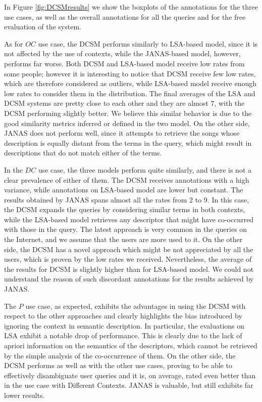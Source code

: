 In Figure \ref{fig:DCSMresults} we show the boxplots of the annotations for the three use cases, as well as the overall annotations for all the queries and for the free evaluation of the system.

As for $OC$ use case, the DCSM performs similarly to LSA-based model, since it is not affected by the use of contexts, while the JANAS-based model, however, performs far worse. Both DCSM and LSA-based model receive low rates from some people; however it is interesting to notice that DCSM receive few low rates, which are therefore considered as outliers, while LSA-based model receive enough low rates to consider them in the distribution. The final averages of the LSA and DCSM systems are pretty close to each other and they are almost $7$, with the DCSM performing slightly better. We believe this similar behavior is due to the good similarity metrics inferred or defined in the two model. On the other side, JANAS does not perform well, since it attempts to retrieve the songs whose description is equally distant from the terms in the query, which might result in descriptions that do not match either of the terms.

In the $DC$ use case, the three models perform quite similarly, and there is not a clear prevalence of either of them. The DCSM receives annotations with a high variance, while annotations on LSA-based model are lower but constant. The results obtained by JANAS spans almost all the rates from 2 to 9. In this case, the DCSM expands the queries by considering similar terms in both contexts, while the LSA-based model retrieves any descriptor that might have co-occurred with those in the query. The latest approach is very common in the queries on the Internet, and we assume that the users are more used to it. On the other side, the DCSM has a novel approach which might be not appreciated by all the users, which is proven by the low rates we received. Nevertheless, the average of the results for DCSM is slightly higher than for LSA-based model. We could not understand the reason of such discordant annotations for the results achieved by JANAS.

The $P$ use case, as expected, exhibits the advantages in using the DCSM with respect to the other approaches and clearly highlights the bias introduced by ignoring the context in semantic description. In particular, the evaluations on LSA exhibit a notable drop of performance. This is clearly due to the lack of apriori information on the semantics of the descriptors, which cannot be retrieved by the simple analysis of the co-occurrence of them. On the other side, the DCSM performs as well as with the other use cases, proving to be able to effectively disambiguate user queries and it is, on average, rated even better than in the use case with Different Contexts. JANAS is valuable, but still exhibits far lower results. 

